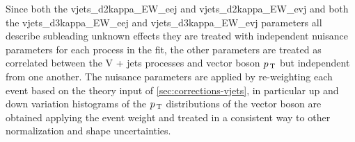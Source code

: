 Since both the vjets\_d2kappa\_EW\_eej and vjets\_d2kappa\_EW\_evj and both the
vjets\_d3kappa\_EW\_eej and vjets\_d3kappa\_EW\_evj parameters
all describe subleading unknown effects they are treated with independent
nuisance parameters for each process in the fit, the other parameters are
treated as correlated between the V + jets processes and vector boson $p_\mathrm{\, T}$ but
independent from one another. The nuisance parameters are applied by
re-weighting each event based on the theory input of
\cref{sec:corrections-vjets}, in particular up and down variation histograms of
the $p_\mathrm{\, T}$ distributions of the vector boson are obtained applying the event
weight and treated in a consistent way to other normalization and shape
uncertainties.

